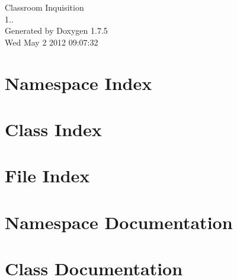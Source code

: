 \documentclass[a4paper]{book}
\begin{document}
\hypersetup{pageanchor=false,citecolor=blue}
\begin{titlepage}
\vspace*{7cm}
\begin{center}
{\Large \-Classroom \-Inquisition \\[1ex]\large 1.. }\\
\vspace*{1cm}
{\large \-Generated by Doxygen 1.7.5}\\
\vspace*{0.5cm}
{\small Wed May 2 2012 09:07:32}\\
\end{center}
\end{titlepage}
\clearemptydoublepage
{}
\tableofcontents
\clearemptydoublepage
{}
\hypersetup{pageanchor=true,citecolor=blue}
\chapter{\-Namespace \-Index}

\chapter{\-Class \-Index}

\chapter{\-File \-Index}

\chapter{\-Namespace \-Documentation}


\chapter{\-Class \-Documentation}







\end{document}
